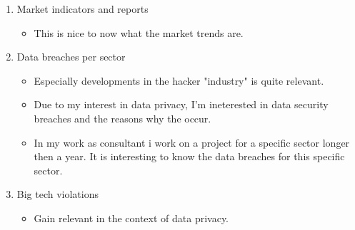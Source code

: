 \begin{enumerate}
    
    
     \item Market indicators and reports
     \begin{itemize}
  \item This is nice to now what the market trends are.
     \end{itemize}
 \item Data breaches per sector
 \begin{itemize}
  \item Especially developments in the hacker "industry" is quite relevant.
\item Due to my interest in data privacy, I'm ineterested in data security breaches and the reasons why the occur.
\item In my work as consultant i work on a project for a specific sector longer then a year. It is interesting to know the
data breaches for this specific sector.
     \end{itemize}

 \item Big tech violations
 \begin{itemize}
     \item Gain relevant in the context of data privacy.
 \end{itemize}


\end{enumerate}
